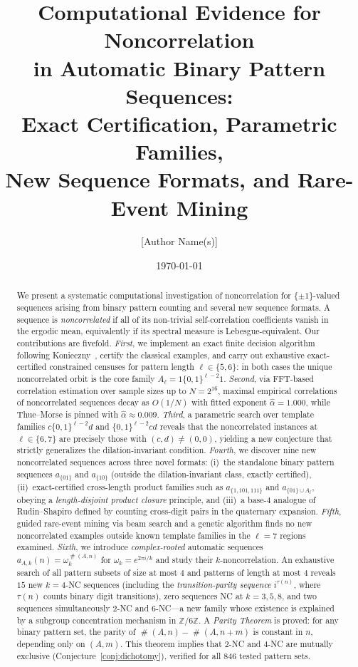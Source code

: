 \documentclass[11pt]{article}
\title{\textbf{Computational Evidence for Noncorrelation\\
in Automatic Binary Pattern Sequences:\\
Exact Certification, Parametric Families,\\
New Sequence Formats, and Rare-Event Mining}}
\author{[Author Name(s)]}
\date{\today}
\theoremstyle{definition}
\DeclareMathOperator{\occ}{\#}
\newcommand{\Z}{\mathbb{Z}}
\begin{document}
\maketitle

\begin{abstract}
We present a systematic computational investigation of noncorrelation
for $\{\pm 1\}$-valued sequences arising from binary pattern counting and
several new sequence formats. A sequence is \emph{noncorrelated} if all
of its non-trivial self-correlation coefficients vanish in the ergodic
mean, equivalently if its spectral measure is Lebesgue-equivalent.
Our contributions are fivefold.
\emph{First}, we implement an exact finite decision algorithm following
Konieczny~\cite{Kon21}, certify the classical examples, and carry out
exhaustive exact-certified constrained censuses for pattern length
$\ell \in \{5, 6\}$: in both cases the unique noncorrelated orbit is
the core family $A_\ell = 1\{0,1\}^{\ell-2}1$.
\emph{Second}, via FFT-based correlation estimation over sample sizes up
to $N = 2^{16}$, maximal empirical correlations of noncorrelated sequences
decay as $O(1/N)$ with fitted exponent $\hat\alpha = 1.000$, while
Thue--Morse is pinned with $\hat\alpha \approx 0.009$.
\emph{Third}, a parametric search over template families
$c\{0,1\}^{\ell-2}d$ and $\{0,1\}^{\ell-2}cd$ reveals that the
noncorrelated instances at $\ell \in \{6,7\}$ are precisely those with
$(c,d) \neq (0,0)$, yielding a new conjecture that strictly generalizes
the dilation-invariant condition.
\emph{Fourth}, we discover nine new noncorrelated sequences across three
novel formats: (i)~the standalone binary pattern sequences $a_{\{01\}}$
and $a_{\{10\}}$ (outside the dilation-invariant class, exactly certified),
(ii)~exact-certified cross-length product families such as
$a_{\{1,101,111\}}$ and $a_{\{01\} \cup A_\ell}$, obeying a
\emph{length-disjoint product closure} principle, and (iii)~a
base-$4$ analogue of Rudin--Shapiro defined by counting
cross-digit pairs in the quaternary expansion.
\emph{Fifth}, guided rare-event mining via beam search and a genetic
algorithm finds no new noncorrelated examples outside known template
families in the $\ell = 7$ regions examined.
\emph{Sixth}, we introduce \emph{complex-rooted} automatic sequences
$a_{A,k}(n) = \omega_k^{\occ(A,n)}$ for $\omega_k = e^{2\pi i/k}$ and
study their $k$-noncorrelation.  An exhaustive search of all pattern
subsets of size at most $4$ and patterns of length at most $4$ reveals
$15$ new $k=4$-NC sequences (including the \emph{transition-parity
sequence} $i^{\tau(n)}$, where $\tau(n)$ counts binary digit
transitions), zero sequences NC at $k = 3, 5, 8$, and two sequences
simultaneously $2$-NC and $6$-NC---a new family whose existence is
explained by a subgroup concentration mechanism in $\Z/6\Z$.
A \emph{Parity Theorem} is proved: for any binary pattern set, the
parity of $\occ(A,n) - \occ(A,n+m)$ is constant in $n$, depending
only on $(A,m)$.  This theorem implies that $2$-NC and $4$-NC are
mutually exclusive (Conjecture~\ref{conj:dichotomy}), verified for
all $846$ tested pattern sets.
\end{abstract}
\end{document}
